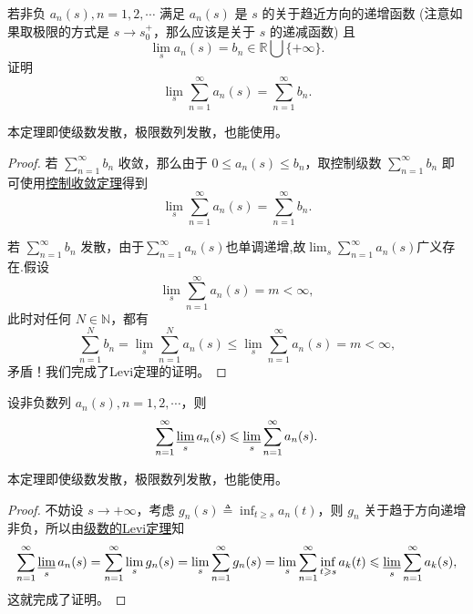 \documentclass[../../main.tex]{subfiles}
\begin{document}
\begin{theorem}[级数的Levi定理]\label{theorem:级数的Levi定理}
若非负 \( a_n(s), n = 1, 2, \cdots \) 满足 \( a_n(s) \) 是 \( s \) 的关于趋近方向的递增函数 (注意如果取极限的方式是 \( s \to s_0^+ \)，那么应该是关于 \( s \) 的递减函数) 且
\[
\lim_{s} a_n(s) = b_n \in \mathbb{R} \bigcup \{+\infty\}.
\]
证明
\[
\lim_{s} \sum_{n = 1}^{\infty} a_n(s) = \sum_{n = 1}^{\infty} b_n.
\]
\end{theorem}
\begin{note}
本定理即使级数发散，极限数列发散，也能使用。
\end{note}
\begin{proof}
若 \( \sum_{n = 1}^{\infty} b_n \) 收敛，那么由于 \( 0 \leqslant a_n(s) \leqslant b_n \)，取控制级数 \( \sum_{n = 1}^{\infty} b_n \) 即可使用\hyperref[theorem:级数的控制收敛定理]{控制收敛定理}得到
\[
\lim_{s} \sum_{n = 1}^{\infty} a_n(s) = \sum_{n = 1}^{\infty} b_n.
\]

若 \( \sum_{n = 1}^{\infty} b_n \) 发散，由于$\sum_{n = 1}^{\infty} a_n(s)$也单调递增,故$\lim_{s} \sum_{n = 1}^{\infty} a_n(s) $广义存在.假设
\[
\lim_{s} \sum_{n = 1}^{\infty} a_n(s) = m < \infty,
\]
此时对任何 \( N \in \mathbb{N} \)，都有
\[
\sum_{n = 1}^{N} b_n = \lim_{s} \sum_{n = 1}^{N} a_n(s) \leqslant \lim_{s} \sum_{n = 1}^{\infty} a_n(s) = m < \infty,
\]
矛盾！我们完成了Levi定理的证明。

\end{proof}

\begin{lemma}[级数的Fatou引理]\label{lemma:级数的Fatou引理}
设非负数列 \( a_n(s), n = 1, 2, \cdots \)，则
\[
\sum_{n = 1}^{\infty} \varliminf_{s} a_n(s) \leqslant \varliminf_{s} \sum_{n = 1}^{\infty} a_n(s).
\]
\end{lemma}
\begin{note}
本定理即使级数发散，极限数列发散，也能使用。
\end{note}
\begin{proof}
不妨设 \( s \to +\infty \)，考虑 \( g_n(s) \triangleq \inf_{t \geqslant s} a_n(t) \)，则 \( g_n \) 关于趋于方向递增非负，所以由\hyperref[theorem:级数的Levi定理]{级数的Levi定理}知
\[
\sum_{n = 1}^{\infty} \varliminf_{s} a_n(s) = \sum_{n = 1}^{\infty} \lim_{s} g_n(s) = \lim_{s} \sum_{n = 1}^{\infty} g_n(s) = \lim_{s} \sum_{n = 1}^{\infty} \inf_{t \geqslant s} a_k(t) \leqslant \varliminf_{s} \sum_{n = 1}^{\infty} a_k(s),
\]
这就完成了证明。

\end{proof}
\end{document}
